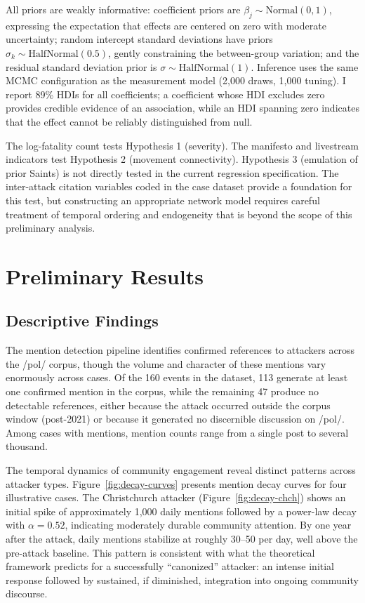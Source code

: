 \documentclass[12pt]{article}
\begin{document}
All priors are weakly informative: coefficient priors are $\beta_j \sim \text{Normal}(0, 1)$, expressing the expectation that effects are centered on zero with moderate uncertainty; random intercept standard deviations have priors $\sigma_k \sim \text{HalfNormal}(0.5)$, gently constraining the between-group variation; and the residual standard deviation prior is $\sigma \sim \text{HalfNormal}(1)$. Inference uses the same MCMC configuration as the measurement model (2,000 draws, 1,000 tuning). I report 89\% HDIs for all coefficients; a coefficient whose HDI excludes zero provides credible evidence of an association, while an HDI spanning zero indicates that the effect cannot be reliably distinguished from null.

The log-fatality count tests Hypothesis 1 (severity). The manifesto and livestream indicators test Hypothesis 2 (movement connectivity). Hypothesis 3 (emulation of prior Saints) is not directly tested in the current regression specification. The inter-attack citation variables coded in the case dataset provide a foundation for this test, but constructing an appropriate network model requires careful treatment of temporal ordering and endogeneity that is beyond the scope of this preliminary analysis.

\section{Preliminary Results}

\subsection{Descriptive Findings}

The mention detection pipeline identifies confirmed references to attackers across the /pol/ corpus, though the volume and character of these mentions vary enormously across cases. Of the 160 events in the dataset, 113 generate at least one confirmed mention in the corpus, while the remaining 47 produce no detectable references, either because the attack occurred outside the corpus window (post-2021) or because it generated no discernible discussion on /pol/. Among cases with mentions, mention counts range from a single post to several thousand.

The temporal dynamics of community engagement reveal distinct patterns across attacker types. Figure~\ref{fig:decay-curves} presents mention decay curves for four illustrative cases. The Christchurch attacker (Figure~\ref{fig:decay-chch}) shows an initial spike of approximately 1,000 daily mentions followed by a power-law decay with $\alpha = 0.52$, indicating moderately durable community attention. By one year after the attack, daily mentions stabilize at roughly 30--50 per day, well above the pre-attack baseline. This pattern is consistent with what the theoretical framework predicts for a successfully ``canonized'' attacker: an intense initial response followed by sustained, if diminished, integration into ongoing community discourse.
\end{document}
